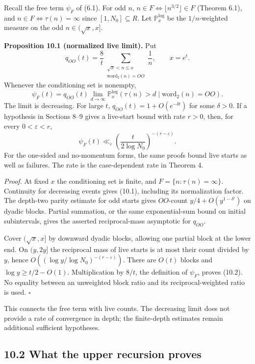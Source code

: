 \documentclass[11pt,a4paper]{article}
\begin{document}
Recall the free term \(\psi_F\) of (6.1). For odd \(n\),
\(n\in F\iff\lfloor n^{3/2}\rfloor\in F\) (Theorem 6.1), and
\(n\in F\iff\tau(n)=\infty\) since \([1,N_0]\subseteq R\). Let
\(\mathbb P^{\log}_x\) be the \(1/n\)-weighted measure on the odd
\(n\in(\sqrt x,x]\).

\textbf{Proposition 10.1 (normalized live limit).} Put \[
q_{OO}(t)=\frac8t
 \sum_{\substack{\sqrt x<n\le x\\ \mathrm{word}_2(n)=OO}}\frac1n,
\qquad x=e^t.
\] Whenever the conditioning set is nonempty, \[
\psi_F(t)=q_{OO}(t)\lim_{d\to\infty}
 \mathbb P_x^{\log}(\tau(n)>d\mid\mathrm{word}_2(n)=OO).
\tag{10.1}
\] The limit is decreasing. For large \(t\),
\(q_{OO}(t)=1+O(e^{-\delta t})\) for some \(\delta>0\). If a hypothesis
in Sections 8--9 gives a live-start bound with rate \(r>0\), then, for
every \(0<\varepsilon<r\), \[
\psi_F(t)\ll_\varepsilon
 \left(\frac{t}{2\log N_0}\right)^{-(r-\varepsilon)}.
\tag{10.2}
\] For the one-sided and no-momentum forms, the same proofs bound live
starts as well as failures. The rate is the case-dependent rate in
Theorem 4.

\emph{Proof.} At fixed \(x\) the conditioning set is finite, and
\(F=\{n:\tau(n)=\infty\}\). Continuity for decreasing events gives
(10.1), including its normalization factor. The depth-two parity
estimate for odd starts gives \(OO\)-count \(y/4+O(y^{1-\delta'})\) on
dyadic blocks. Partial summation, or the same exponential-sum bound on
initial subintervals, gives the asserted reciprocal-mass asymptotic for
\(q_{OO}\).

Cover \((\sqrt x,x]\) by downward dyadic blocks, allowing one partial
block at the lower end. On \((y,2y]\) the reciprocal mass of live starts
is at most their count divided by \(y\), hence
\(O((\log y/\log N_0)^{-(r-\varepsilon)})\). There are \(O(t)\) blocks
and \(\log y\ge t/2-O(1)\). Multiplication by \(8/t\), the definition of
\(\psi_F\), proves (10.2). No equality between an unweighted block ratio
and its reciprocal-weighted ratio is used. \(\square\)

This connects the free term with live counts. The decreasing limit does
not provide a rate of convergence in depth; the finite-depth estimates
remain additional sufficient hypotheses.

\subsection{10.2 What the upper recursion
proves}\label{what-the-upper-recursion-proves}
\end{document}
